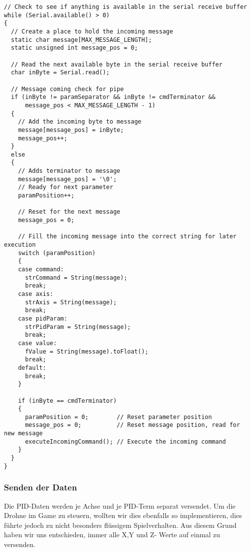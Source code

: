 \vspace{3mm}
\begin{lstlisting}
// Check to see if anything is available in the serial receive buffer
while (Serial.available() > 0)
{
  // Create a place to hold the incoming message
  static char message[MAX_MESSAGE_LENGTH];
  static unsigned int message_pos = 0;

  // Read the next available byte in the serial receive buffer
  char inByte = Serial.read();

  // Message coming check for pipe
  if (inByte != paramSeparator && inByte != cmdTerminator &&
      message_pos < MAX_MESSAGE_LENGTH - 1)
  {
    // Add the incoming byte to message
    message[message_pos] = inByte;
    message_pos++;
  }
  else
  {
    // Adds terminator to message 
    message[message_pos] = '\0';
    // Ready for next parameter
    paramPosition++;

    // Reset for the next message
    message_pos = 0;

    // Fill the incoming message into the correct string for later execution
    switch (paramPosition)
    {
    case command:
      strCommand = String(message);
      break;
    case axis:
      strAxis = String(message);
      break;
    case pidParam:
      strPidParam = String(message);
      break;
    case value:
      fValue = String(message).toFloat();
      break;
    default:
      break;
    }

    if (inByte == cmdTerminator)
    {
      paramPosition = 0;        // Reset parameter position
      message_pos = 0;          // Reset message position, read for new message
      executeIncomingCommand(); // Execute the incoming command
    }
  }
}
\end{lstlisting}

\subsubsection{Senden der Daten}
Die PID-Daten werden je Achse und je PID-Term separat versendet. Um die Drohne im Game zu steuern, wollten wir dies ebenfalls so implementieren, dies führte jedoch zu nicht besonders flüssigem Spielverhalten. Aus diesem Grund haben wir uns entschieden, immer alle X,Y und Z- Werte auf einmal zu versenden.